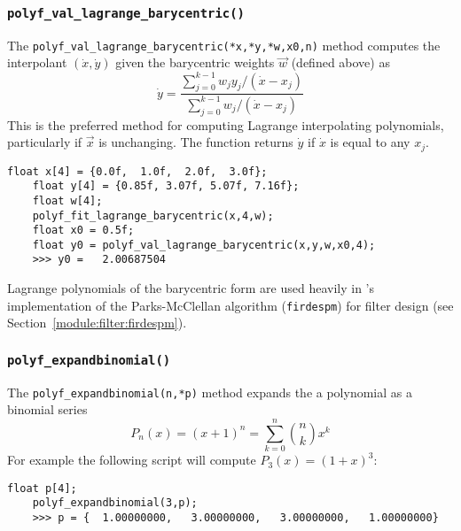 \subsubsection{{\tt polyf\_val\_lagrange\_barycentric()}}
\label{module:math:poly:polyf_val_lagrange_barycentric}
The {\tt polyf\_val\_lagrange\_barycentric(*x,*y,*w,x0,n)} method
computes the interpolant $(\dot{x},\dot{y})$ given the barycentric
weights $\vec{w}$ (defined above) as
%
\begin{equation}
\label{eqn:math:poly:polyval_lagrange_barycentric}
    \dot{y} =   \frac{
                    \sum\limits_{j=0}^{k-1}{ w_j y_j /(\dot{x}-x_j) }
                } {
                    \sum\limits_{j=0}^{k-1}{     w_j /(\dot{x}-x_j) }
                }
\end{equation}
%
This is the preferred method for computing Lagrange interpolating polynomials,
particularly if $\vec{x}$ is unchanging.
The function returns $\dot{y}$ if $\dot{x}$ is equal to any $x_j$.
%
\begin{Verbatim}[fontsize=\small]
    float x[4] = {0.0f,  1.0f,  2.0f,  3.0f};
    float y[4] = {0.85f, 3.07f, 5.07f, 7.16f};
    float w[4]; 
    polyf_fit_lagrange_barycentric(x,4,w);
    float x0 = 0.5f;
    float y0 = polyf_val_lagrange_barycentric(x,y,w,x0,4);
    >>> y0 =   2.00687504
\end{Verbatim}
%
Lagrange polynomials of the barycentric form are used heavily in
\liquid's implementation of the Parks-McClellan algorithm
({\tt firdespm}) for filter design
(see Section~\ref{module:filter:firdespm}).

\subsubsection{{\tt polyf\_expandbinomial()}}
\label{module:math:poly:polyf_expandbinomial}
The {\tt polyf\_expandbinomial(n,*p)} method
expands the a polynomial as a binomial series
%
\begin{equation}
\label{eqn:math:poly:expandbinomial}
    P_n(x) = (x+1)^n = \sum_{k=0}^{n}{ {n \choose k} x^k}
\end{equation}
%
For example the following script will compute
$P_3(x) = (1+x)^3$:
%
\begin{Verbatim}[fontsize=\small]
    float p[4];
    polyf_expandbinomial(3,p);
    >>> p = {  1.00000000,   3.00000000,   3.00000000,   1.00000000}
\end{Verbatim}
%

